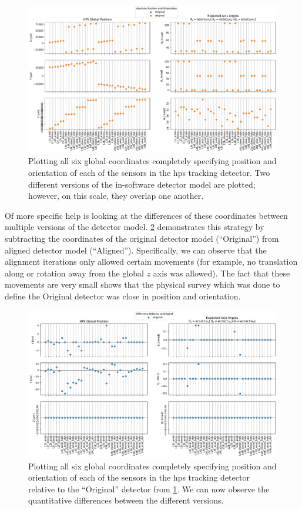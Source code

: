 \begin{figure}
  \centering
  \includegraphics[width=\textwidth]{figures/hps/alignment/example-det-vis-abs.pdf}
  \caption{Plotting all six global coordinates completely specifying position and orientation
    of each of the sensors in the \ac{hps} tracking detector. Two different versions of the
    in-software detector model are plotted; however, on this scale, they overlap one another.}
  \label{fig:example-det-vis-abs}
\end{figure}

Of more specific help is looking at the differences of these coordinates between multiple versions
of the detector model. \cref{fig:example-det-vis-diff} demonstrates this strategy by subtracting
the coordinates of the original detector model (``Original'') from aligned detector model (``Aligned'').
Specifically, we can observe that the alignment iterations only allowed certain movements
(for example, no translation along or rotation away from the global $z$ axis was allowed).
The fact that these movements are very small shows that the physical survey which was done
to define the Original detector was close in position and orientation.

\begin{figure}
  \centering
  \includegraphics[width=\textwidth]{figures/hps/alignment/example-det-vis-diff.pdf}
  \caption{Plotting all six global coordinates completely specifying position and
    orientation of each of the sensors in the \ac{hps} tracking detector relative to
    the ``Original'' detector from \cref{fig:example-det-vis-abs}. We can now observe
    the quantitative differences between the different versions.}
  \label{fig:example-det-vis-diff}
\end{figure}

